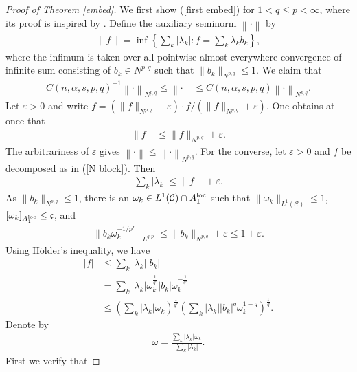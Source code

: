 \documentclass[10pt,reqno]{amsart}
\numberwithin{equation}{section}
\begin{document}
\begin{proof}[Proof of Theorem \ref{embed}]
We first show (\ref{first embed}) for $1<q\leq p<\infty$, where its proof is inspired by \cite[Theorem 2.1]{MST}. Define the auxiliary seminorm $\left\|\cdot\right\|$ by
\begin{align}\label{N block}
\|f\|=\inf\left\{\sum_{k}|\lambda_{k}|:f=\sum_{k}\lambda_{k}b_{k}\right\},
\end{align}
where the infimum is taken over all pointwise almost everywhere convergence of infinite sum consisting of $b_{k}\in N^{p,q}$ such that $\|b_{k}\|_{N^{p,q}}\leq 1$. We claim that 
\begin{align}\label{self twist}
C(n,\alpha,s,p,q)^{-1}\left\|\cdot\right\|_{N^{p,q}}\leq\left\|\cdot\right\|\leq C(n,\alpha,s,p,q)\left\|\cdot\right\|_{N^{p,q}}. 
\end{align}
Let $\varepsilon>0$ and write $f=(\|f\|_{N^{p,q}}+\varepsilon)\cdot f/(\|f\|_{N^{p,q}}+\varepsilon)$. One obtains at once that
\begin{align*}
\|f\|\leq\|f\|_{N^{p,q}}+\varepsilon.
\end{align*}
The arbitrariness of $\varepsilon$ gives $\left\|\cdot\right\|\leq\left\|\cdot\right\|_{N^{p,q}}$. For the converse, let $\varepsilon>0$ and $f$ be decomposed as in (\ref{N block}). Then
\begin{align*}
\sum_{k}|\lambda_{k}|\leq\|f\|+\varepsilon.
\end{align*}
As $\|b_{k}\|_{N^{p,q}}\leq 1$, there is an $\omega_{k}\in L^{1}(\mathcal{C})\cap A_{1}^{\rm loc}$ such that $\|\omega_{k}\|_{L^{1}(\mathcal{C})}\leq 1$, $[\omega_{k}]_{A_{1}^{\rm loc}}\leq\mathfrak{c}$, and 
\begin{align*}
\|b_{k}\omega_{k}^{-1/p'}\|_{L^{q,p}}\leq \|b_{k}\|_{N^{p,q}}+\varepsilon\leq 1+\varepsilon.
\end{align*}
Using H\"older's inequality, we have 
\begin{align*}
|f|&\leq\sum_{k}|\lambda_{k}||b_{k}|\\
&=\sum_{k}|\lambda_{k}|\omega_{k}^{\frac{1}{q'}}|b_{k}|\omega_{k}^{-\frac{1}{q'}}\\
&\leq\left(\sum_{k}|\lambda_{k}|\omega_{k}\right)^{\frac{1}{q'}}\left(\sum_{k}|\lambda_{k}||b_{k}|^{q}\omega_{k}^{1-q}\right)^{\frac{1}{q}}.
\end{align*}
Denote by
\begin{align*}
\omega=\frac{\sum_{k}|\lambda_{k}|\omega_{k}}{\sum_{k}|\lambda_{k}|}.
\end{align*}
First we verify that 

\end{proof}
\end{document}
